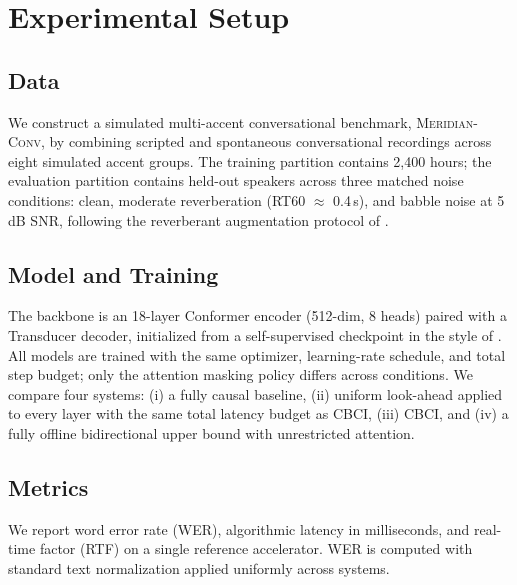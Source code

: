 \section{Experimental Setup}
\label{sec:experiments}
\subsection{Data}
We construct a simulated multi-accent conversational benchmark, \textsc{Meridian-Conv}, by combining
scripted and spontaneous conversational recordings across eight simulated accent groups. The training
partition contains 2,400 hours; the evaluation partition contains held-out speakers across three
matched noise conditions: clean, moderate reverberation (RT60 $\approx$ 0.4\,s), and babble noise at
5\,dB SNR, following the reverberant augmentation protocol of \citet{andersson2021noise}.

\subsection{Model and Training}
The backbone is an 18-layer Conformer encoder (512-dim, 8 heads) paired with a Transducer decoder,
initialized from a self-supervised checkpoint in the style of \citet{schmidt2023wav2vec}. All models are
trained with the same optimizer, learning-rate schedule, and total step budget; only the attention
masking policy differs across conditions. We compare four systems: (i) a fully causal baseline, (ii)
uniform look-ahead applied to every layer with the same total latency budget as CBCI, (iii) CBCI, and
(iv) a fully offline bidirectional upper bound with unrestricted attention.

\subsection{Metrics}
We report word error rate (WER), algorithmic latency in milliseconds, and real-time factor (RTF) on a
single reference accelerator. WER is computed with standard text normalization applied uniformly across
systems.
